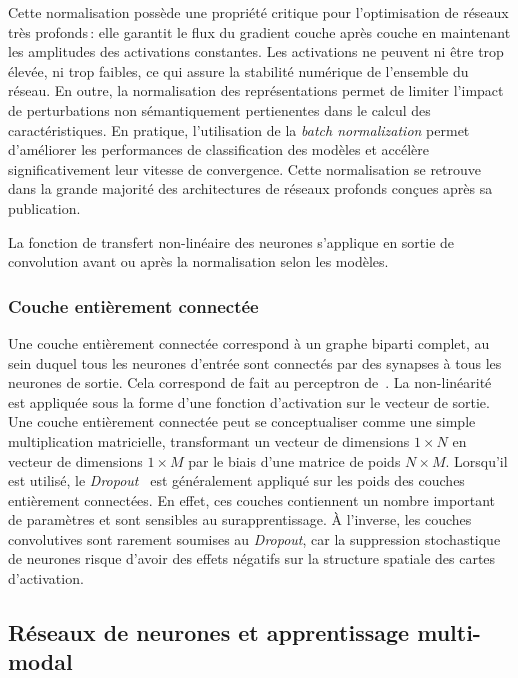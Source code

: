 Cette normalisation possède une propriété critique pour l'optimisation de réseaux très profonds\,: elle garantit le flux du gradient couche après couche en maintenant les amplitudes des activations constantes. Les activations ne peuvent ni être trop élevée, ni trop faibles, ce qui assure la stabilité numérique de l'ensemble du réseau. En outre, la normalisation des représentations permet de limiter l'impact de perturbations non sémantiquement pertienentes dans le calcul des caractéristiques. En pratique, l'utilisation de la \emph{batch normalization} permet d'améliorer les performances de classification des modèles et accélère significativement leur vitesse de convergence. Cette normalisation se retrouve dans la grande majorité des architectures de réseaux profonds conçues après sa publication.

La fonction de transfert non-linéaire des neurones s'applique en sortie de convolution avant ou après la normalisation selon les modèles.

\subsubsection{Couche entièrement connectée}

Une couche entièrement connectée correspond à un graphe biparti complet, au sein duquel tous les neurones d'entrée sont connectés par des synapses à tous les neurones de sortie. Cela correspond de fait au perceptron de~\citet{rosenblatt_perceptron_1957}. La non-linéarité est appliquée sous la forme d'une fonction d'activation sur le vecteur de sortie. Une couche entièrement connectée peut se conceptualiser comme une simple multiplication matricielle, transformant un vecteur de dimensions $1\times{}N$ en vecteur de dimensions $1\times{}M$ par le biais d'une matrice de poids $N\times{}M$. Lorsqu'il est utilisé, le \emph{Dropout}~\cite{srivastava_dropout_2014} est généralement appliqué sur les poids des couches entièrement connectées. En effet, ces couches contiennent un nombre important de paramètres et sont sensibles au surapprentissage. À l'inverse, les couches convolutives sont rarement soumises au \emph{Dropout}, car la suppression stochastique de neurones risque d'avoir des effets négatifs sur la structure spatiale des cartes d'activation.

\subsection{Réseaux de neurones et apprentissage multi-modal}

